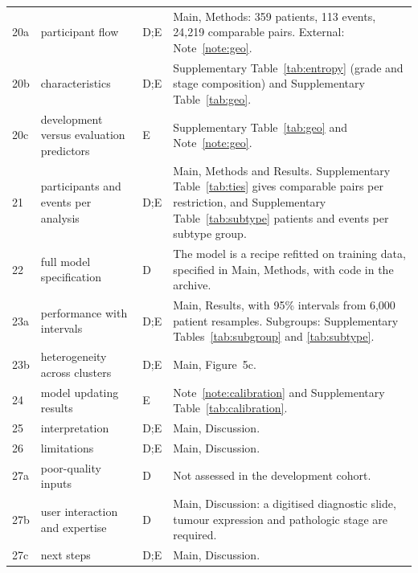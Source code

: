 \documentclass[11pt]{article}
\begin{document}
{\begin{longtable}{p{}p{}p{}p{}}
20a & participant flow & D;E & Main, Methods: 359 patients, 113 events, 24,219 comparable pairs. External: Note~\ref{note:geo}. \\
20b & characteristics & D;E & Supplementary Table~\ref{tab:entropy} (grade and stage composition) and Supplementary Table~\ref{tab:geo}. \\
20c & development versus evaluation predictors & E & Supplementary Table~\ref{tab:geo} and Note~\ref{note:geo}. \\
21 & participants and events per analysis & D;E & Main, Methods and Results. Supplementary Table~\ref{tab:ties} gives comparable pairs per restriction, and Supplementary Table~\ref{tab:subtype} patients and events per subtype group. \\
22 & full model specification & D & The model is a recipe refitted on training data, specified in Main, Methods, with code in the archive. \\
23a & performance with intervals & D;E & Main, Results, with 95\% intervals from 6,000 patient resamples. Subgroups: Supplementary Tables~\ref{tab:subgroup} and \ref{tab:subtype}. \\
23b & heterogeneity across clusters & D;E & Main, Figure~5c. \\
24 & model updating results & E & Note~\ref{note:calibration} and Supplementary Table~\ref{tab:calibration}. \\
25 & interpretation & D;E & Main, Discussion. \\
26 & limitations & D;E & Main, Discussion. \\
27a & poor-quality inputs & D & Not assessed in the development cohort. \\
27b & user interaction and expertise & D & Main, Discussion: a digitised diagnostic slide, tumour expression and pathologic stage are required. \\
27c & next steps & D;E & Main, Discussion. \\
\end{longtable}}



\end{document}
